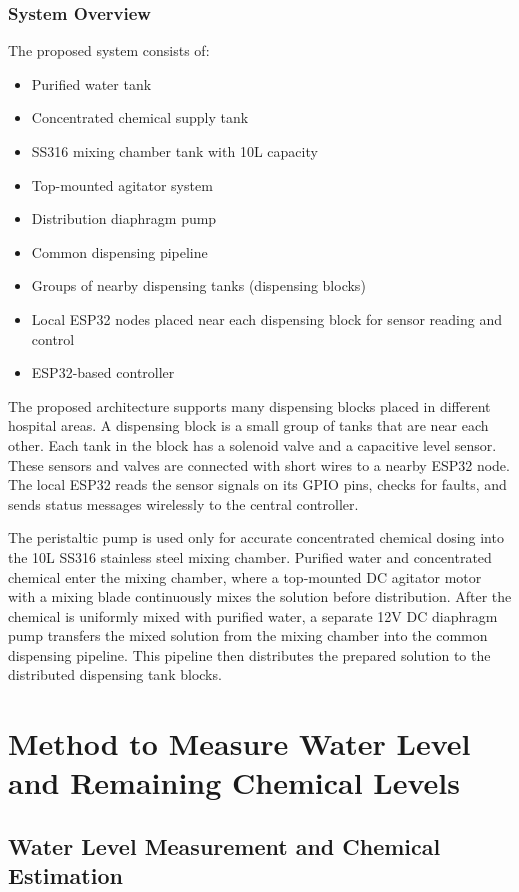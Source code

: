 \documentclass[12pt,a4paper]{report}
\begin{document}
\subsection*{System Overview}
The proposed system consists of:
\begin{itemize}
    \item Purified water tank
    \item Concentrated chemical supply tank
    \item SS316 mixing chamber tank with 10L capacity
    \item Top-mounted agitator system
    \item Distribution diaphragm pump
    \item Common dispensing pipeline
    \item Groups of nearby dispensing tanks (dispensing blocks)
    \item Local ESP32 nodes placed near each dispensing block for sensor reading and control
    \item ESP32-based controller
\end{itemize}

The proposed architecture supports many dispensing blocks placed in different hospital areas. A dispensing block is a small group of tanks that are near each other. Each tank in the block has a solenoid valve and a capacitive level sensor. These sensors and valves are connected with short wires to a nearby ESP32 node. The local ESP32 reads the sensor signals on its GPIO pins, checks for faults, and sends status messages wirelessly to the central controller.

The peristaltic pump is used only for accurate concentrated chemical dosing into the 10L SS316 stainless steel mixing chamber. Purified water and concentrated chemical enter the mixing chamber, where a top-mounted DC agitator motor with a mixing blade continuously mixes the solution before distribution. After the chemical is uniformly mixed with purified water, a separate 12V DC diaphragm pump transfers the mixed solution from the mixing chamber into the common dispensing pipeline. This pipeline then distributes the prepared solution to the distributed dispensing tank blocks.


\chapter{Method to Measure Water Level and Remaining Chemical Levels}

\section{Water Level Measurement and Chemical Estimation}
\end{document}
